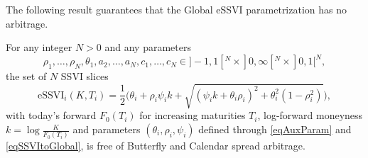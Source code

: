 \documentclass{article}
\begin{document}
	The following result guarantees that the Global eSSVI parametrization
has no arbitrage.

	\begin{proposition}

For any integer $N>0$ and any parameters
$$\rho_1,\dots,\rho_N,\theta_1,a_2,\dots,a_N,c_1,\dots,c_N\in]-1,1[^N\times]0,\infty[^N\times]0,1[^N,$$
the set of $N$ SSVI slices
$$\text{eSSVI}_i(K,T_i) = \frac{1}{2}\bigl(\theta_i+\rho_i\psi_i k + \sqrt{(\psi_i k + \theta_i\rho_i)^2 + \theta_i^2(1-\rho_i^2)}\bigr),$$
with today's forward $F_0(T_i)$ for increasing maturities $T_i$, log-forward moneyness $k=\log\frac{K}{F_0(T_i)}$ and parameters $(\theta_i,\rho_i,\psi_i)$ defined through \cref{eqAuxParam} and \cref{eqSSVItoGlobal}, is free of Butterfly and Calendar spread arbitrage.

\end{proposition}
\end{document}
